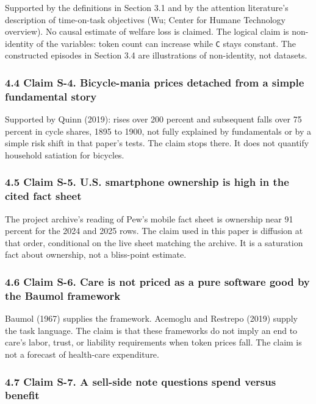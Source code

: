 \documentclass[
  10pt,
]{article}
\begin{document}
Supported by the definitions in Section 3.1 and by the attention
literature's description of time-on-task objectives (Wu; Center for
Humane Technology overview). No causal estimate of welfare loss is
claimed. The logical claim is non-identity of the variables: token count
can increase while \texttt{C} stays constant. The constructed episodes
in Section 3.4 are illustrations of non-identity, not datasets.

\subsubsection{4.4 Claim S-4. Bicycle-mania prices detached from a
simple fundamental
story}\label{claim-s-4.-bicycle-mania-prices-detached-from-a-simple-fundamental-story}

Supported by Quinn (2019): rises over 200 percent and subsequent falls
over 75 percent in cycle shares, 1895 to 1900, not fully explained by
fundamentals or by a simple risk shift in that paper's tests. The claim
stops there. It does not quantify household satiation for bicycles.

\subsubsection{4.5 Claim S-5. U.S. smartphone ownership is high in the
cited fact
sheet}\label{claim-s-5.-u.s.-smartphone-ownership-is-high-in-the-cited-fact-sheet}

The project archive's reading of Pew's mobile fact sheet is ownership
near 91 percent for the 2024 and 2025 rows. The claim used in this paper
is diffusion at that order, conditional on the live sheet matching the
archive. It is a saturation fact about ownership, not a bliss-point
estimate.

\subsubsection{4.6 Claim S-6. Care is not priced as a pure software good
by the Baumol
framework}\label{claim-s-6.-care-is-not-priced-as-a-pure-software-good-by-the-baumol-framework}

Baumol (1967) supplies the framework. Acemoglu and Restrepo (2019)
supply the task language. The claim is that these frameworks do not
imply an end to care's labor, trust, or liability requirements when
token prices fall. The claim is not a forecast of health-care
expenditure.

\subsubsection{4.7 Claim S-7. A sell-side note questions spend versus
benefit}\label{claim-s-7.-a-sell-side-note-questions-spend-versus-benefit}
\end{document}
